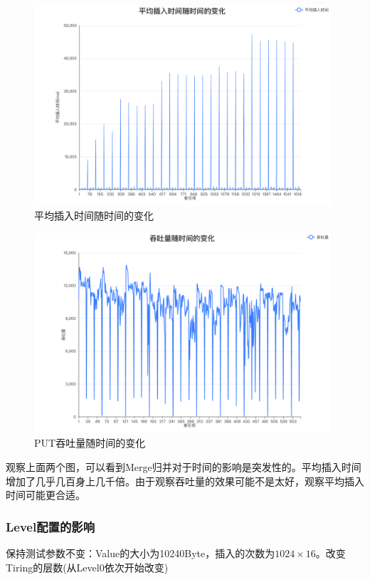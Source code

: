 \documentclass[fontset=windows]{article}
\begin{document}
\begin{figure}[h!]
  \centering
  \includegraphics[width=0.98\textwidth]{Image/平均插入时间随时间的变化.png}
  \caption{平均插入时间随时间的变化}
  \label{fig:平均插入时间随时间的变化}
\end{figure}

\begin{figure}[h!]
  \centering
  \includegraphics[width=0.98\textwidth]{Image/吞吐量随时间的变化.png}
  \caption{PUT吞吐量随时间的变化}
  \label{fig:吞吐量随时间的变化}
\end{figure}
观察上面两个图，可以看到Merge归并对于时间的影响是突发性的。平均插入时间增加了几乎几百身上几千倍。由于观察吞吐量的效果可能不是太好，观察平均插入时间可能更合适。


\subsubsection{Level配置的影响}
保持测试参数不变：Value的大小为10240Byte，插入的次数为$1024 \times 16$。改变Tiring的层数(从Level0依次开始改变)
\end{document}
